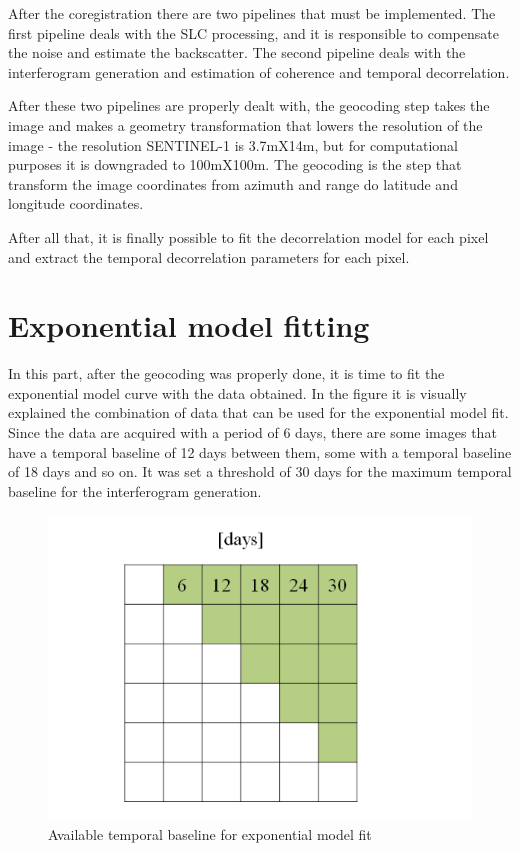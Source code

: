 After the coregistration there are two pipelines that must be implemented. The first pipeline deals with the SLC processing, and it is responsible to compensate the noise and estimate the backscatter. The second pipeline deals with the interferogram generation and estimation of coherence and temporal decorrelation.

After these two pipelines are properly dealt with, the geocoding step takes the image and makes a geometry transformation that lowers the resolution of the image - the resolution SENTINEL-1 is 3.7mX14m, but for computational purposes it is downgraded to 100mX100m. The geocoding is the step that transform the image coordinates from azimuth and range do latitude and longitude coordinates. 

After all that, it is finally possible to fit the decorrelation model for each pixel and extract the temporal decorrelation parameters for each pixel.

\section{Exponential model fitting}
\label{tresponto3}
In this part, after the geocoding was properly done, it is time to fit the exponential model curve with the data obtained. In the figure it is visually explained the combination of data that can be used for the exponential model fit. Since the data are acquired with a period of 6 days, there are some images that have a temporal baseline of 12 days between them, some with a temporal baseline of 18 days and so on. It was set a threshold of 30 days for the maximum temporal baseline for the interferogram generation. 

\begin{figure}[H]
    \centering
    \includegraphics[width=0.7\linewidth]{Cap3/days.png}
    \caption{Available temporal baseline for exponential model fit \cite{Paolo}}
    \label{fig:days available}
\end{figure}

